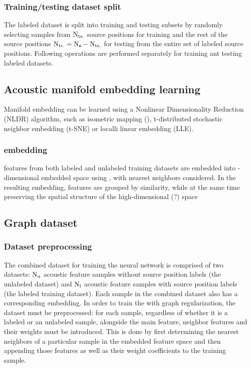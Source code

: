 \documentclass[applsci,article,submit,moreauthors,pdftex]{Definitions/mdpi}
\begin{document}
\subsubsection{Training/testing dataset split}
The labeled dataset is split into training and testing subsets by randomly selecting samples from  $ \mathrm{N}_{\mathrm{ts.}} $ source positions for training and the rest of the source positions $ \mathrm{N}_{\mathrm{tr.}} = \mathrm{N}_{\mathbf{s}} - \mathrm{N}_{\mathrm{ts.}} $ for testing from the entire set of labeled source positions.
Following operations are performed separately for training ant testing labeled datasets.

\subsection{Acoustic manifold embedding learning}

Manifold embedding can be learned using a Nonlinear Dimensionality Reduction (NLDR) algorithm, such as isometric mapping (\isomap{}), t-distributed stochastic neighbor embedding (t-SNE) or localli linear embedding (LLE). 


\subsubsection{\isomap{} embedding}
\srpphat{} features from both labeled and unlabeled training datasets are embedded into \Demb-dimensional embedded space using \isomap{}, with \kemb{} nearest neighbors considered. 
In the resulting embedding, \srpphat{} features are grouped by similarity, while at the same time preserving the spatial structure of the high-dimensional (?) space

\subsection{Graph dataset}

\subsubsection{Dataset preprocessing}
The combined dataset for training the neural network is comprised of two datasets: $ \mathrm{N}_{\mathrm{u}} $ acoustic feature samples without source position labels (the unlabeled dataset) and $ \mathrm{N}_{\mathrm{l}} $ acoustic feature samples with source position labels (the labeled training dataset). Each sample in the combined dataset also has a corresponding \isomap{} embedding.
In order to train the \grnn{} with graph regularization, the dataset must be preprocessed: for each sample, regardless of whether it is a labeled or an unlabeled sample, alongside the main feature, neighbor features and their weights must be introduced. This is done by first determining the \gnbrs{} nearest neighbors of a particular sample in the embedded feature space and then appending those features as well as their weight coefficients to the training sample.
\end{document}
